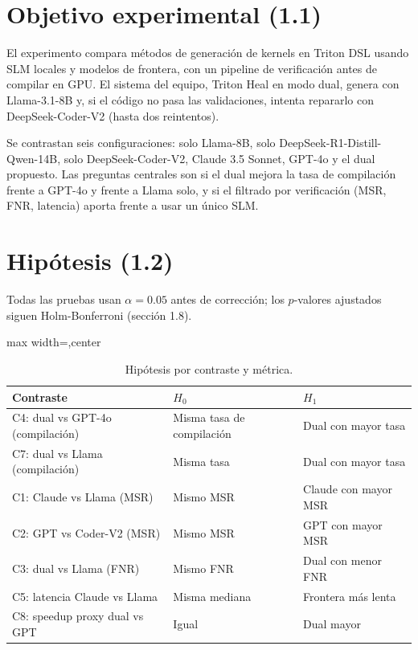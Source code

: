 \section{Objetivo experimental (1.1)}

El experimento compara métodos de generación de kernels en Triton DSL usando SLM locales y modelos de frontera, con un pipeline de verificación antes de compilar en GPU. El sistema del equipo, Triton Heal en modo dual, genera con Llama-3.1-8B y, si el código no pasa las validaciones, intenta repararlo con DeepSeek-Coder-V2 (hasta dos reintentos).

Se contrastan seis configuraciones: solo Llama-8B, solo DeepSeek-R1-Distill-Qwen-14B, solo DeepSeek-Coder-V2, Claude 3.5 Sonnet, GPT-4o y el dual propuesto. Las preguntas centrales son si el dual mejora la tasa de compilación frente a GPT-4o y frente a Llama solo, y si el filtrado por verificación (MSR, FNR, latencia) aporta frente a usar un único SLM.

\section{Hipótesis (1.2)}

Todas las pruebas usan $\alpha = 0.05$ antes de corrección; los $p$-valores ajustados siguen Holm-Bonferroni (sección 1.8).

\begin{table}[ht]
\centering
\caption{Hipótesis por contraste y métrica.}
\label{tab:hipotesis}
\footnotesize
\begin{adjustbox}{max width=\linewidth,center}
\begin{tabularx}{\linewidth}{@{}lXX@{}}
\toprule
Contraste & $H_0$ & $H_1$ \\
\midrule
C4: dual vs GPT-4o (compilación) & Misma tasa de compilación & Dual con mayor tasa \\
C7: dual vs Llama (compilación) & Misma tasa & Dual con mayor tasa \\
C1: Claude vs Llama (MSR) & Mismo MSR & Claude con mayor MSR \\
C2: GPT vs Coder-V2 (MSR) & Mismo MSR & GPT con mayor MSR \\
C3: dual vs Llama (FNR) & Mismo FNR & Dual con menor FNR \\
C5: latencia Claude vs Llama & Misma mediana & Frontera más lenta \\
C8: speedup proxy dual vs GPT & Igual & Dual mayor \\
\bottomrule
\end{tabularx}
\end{adjustbox}
\end{table}

